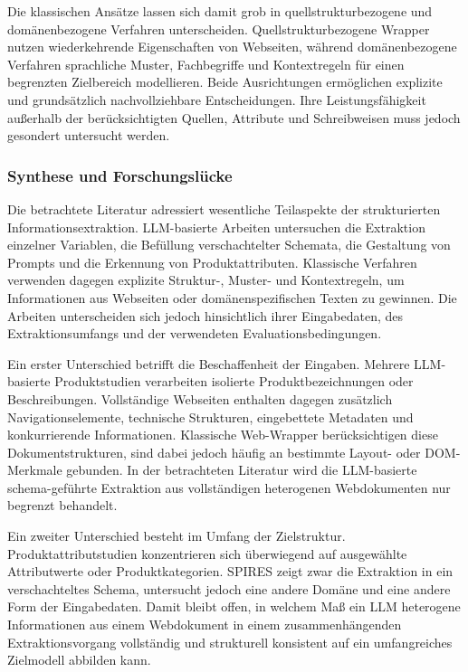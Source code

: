 Die klassischen Ansätze lassen sich damit grob in quellstrukturbezogene und domänenbezogene Verfahren unterscheiden. Quellstrukturbezogene Wrapper nutzen wiederkehrende 
Eigenschaften von Webseiten, während domänenbezogene Verfahren sprachliche Muster, Fachbegriffe und Kontextregeln für einen begrenzten Zielbereich modellieren. Beide 
Ausrichtungen ermöglichen explizite und grundsätzlich nachvollziehbare Entscheidungen. Ihre Leistungsfähigkeit außerhalb der berücksichtigten Quellen, Attribute und 
Schreibweisen muss jedoch gesondert untersucht werden.

\subsubsection{Synthese und Forschungslücke}

Die betrachtete Literatur adressiert wesentliche Teilaspekte der strukturierten Informationsextraktion. LLM-basierte Arbeiten untersuchen die Extraktion einzelner 
Variablen, die Befüllung verschachtelter Schemata, die Gestaltung von Prompts und die Erkennung von Produktattributen. Klassische Verfahren verwenden dagegen 
explizite Struktur-, Muster- und Kontextregeln, um Informationen aus Webseiten oder domänenspezifischen Texten zu gewinnen. Die Arbeiten unterscheiden sich jedoch 
hinsichtlich ihrer Eingabedaten, des Extraktionsumfangs und der verwendeten Evaluationsbedingungen.

Ein erster Unterschied betrifft die Beschaffenheit der Eingaben. Mehrere LLM-basierte Produktstudien verarbeiten isolierte Produktbezeichnungen oder Beschreibungen. 
Vollständige Webseiten enthalten dagegen zusätzlich Navigationselemente, technische Strukturen, eingebettete Metadaten und konkurrierende Informationen. Klassische 
Web-Wrapper berücksichtigen diese Dokumentstrukturen, sind dabei jedoch häufig an bestimmte Layout- oder DOM-Merkmale gebunden. In der betrachteten Literatur wird 
die LLM-basierte schema-geführte Extraktion aus vollständigen heterogenen Webdokumenten nur begrenzt behandelt.

Ein zweiter Unterschied besteht im Umfang der Zielstruktur. Produktattributstudien konzentrieren sich überwiegend auf ausgewählte Attributwerte oder Produktkategorien. 
SPIRES zeigt zwar die Extraktion in ein verschachteltes Schema, untersucht jedoch eine andere Domäne und eine andere Form der Eingabedaten. Damit bleibt offen, in welchem 
Maß ein LLM heterogene Informationen aus einem Webdokument in einem zusammenhängenden Extraktionsvorgang vollständig und strukturell konsistent auf ein umfangreiches 
Zielmodell abbilden kann.

